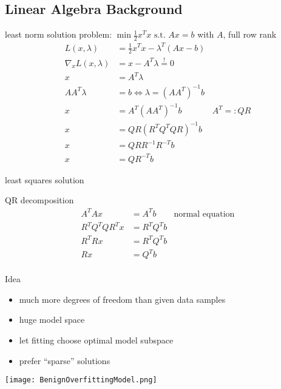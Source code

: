 \documentclass{beamer}
\begin{document}
\subsection{Linear Algebra Background}

\begin{frame} {least norm solution}
problem: \(\min \frac{1}{2} x^Tx \text{ s.t. } Ax = b\) with \(A\), full row rank
\pause
\begin{align*}
	L(x,\lambda) &= \frac{1}{2} x^Tx - \lambda^T (Ax -b)\\
	\nabla_x L(x,\lambda) &= x - A^T \lambda \stackrel{!}{=} 0\\
	x & = A^T \lambda\\
	AA^T \lambda &= b \Leftrightarrow \lambda = (AA^T)^{-1} b\\
	x &= A^T(AA^T)^{-1} b & A^T =: QR\\
	x &= QR(R^TQ^TQR)^{-1}b\\
	x &= QRR^{-1} R^{-T}b\\
	x &= QR^{-T}b
\end{align*}
\end{frame}

\begin{frame}{least squares solution}
\begin{block}{QR decomposition}
\begin{align*}
	A^TAx &= A^T b & \text{normal equation}\\
	R^TQ^TQR^Tx &= R^TQ^Tb\\
	R^TRx & = R^TQ^Tb\\
	Rx &= Q^T b\\
\end{align*}
\end{block}
\end{frame}

\begin{frame}{Idea}
\begin{itemize}
	\item much more degrees of freedom than given data samples
	\item huge model space
	\item let fitting choose optimal model subspace
	\item prefer \enquote{sparse} solutions
\end{itemize}
\vspace{0.1cm}
\pause
\texttt{[image: BenignOverfittingModel.png]}
\end{frame}
\end{document}
